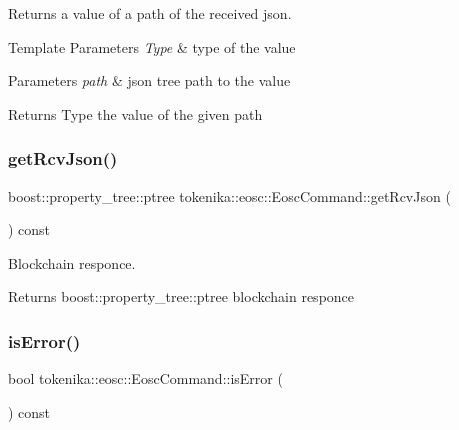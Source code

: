 Returns a value of a path of the received json. 


\begin{DoxyTemplParams}{Template Parameters}
{\em Type} & type of the value \\
\hline
\end{DoxyTemplParams}

\begin{DoxyParams}{Parameters}
{\em path} & json tree path to the value \\
\hline
\end{DoxyParams}
\begin{DoxyReturn}{Returns}
Type the value of the given path 
\end{DoxyReturn}
\mbox{\label{classtokenika_1_1eosc_1_1_eosc_command_a2b451aefc95258d481cff16747fa1888}} 
\subsubsection{\texorpdfstring{get\+Rcv\+Json()}{getRcvJson()}}
{\footnotesize\ttfamily boost\+::property\+\_\+tree\+::ptree tokenika\+::eosc\+::\+Eosc\+Command\+::get\+Rcv\+Json (\begin{DoxyParamCaption}{ }\end{DoxyParamCaption}) const\hspace{0.3cm}{\ttfamily [inline]}}



Blockchain responce. 

\begin{DoxyReturn}{Returns}
boost\+::property\+\_\+tree\+::ptree blockchain responce 
\end{DoxyReturn}
\mbox{\label{classtokenika_1_1eosc_1_1_eosc_command_a63f3adace3f84b59f64c5a54ca0c18dc}} 
\subsubsection{\texorpdfstring{is\+Error()}{isError()}}
{\footnotesize\ttfamily bool tokenika\+::eosc\+::\+Eosc\+Command\+::is\+Error (\begin{DoxyParamCaption}{ }\end{DoxyParamCaption}) const\hspace{0.3cm}{\ttfamily [inline]}}



